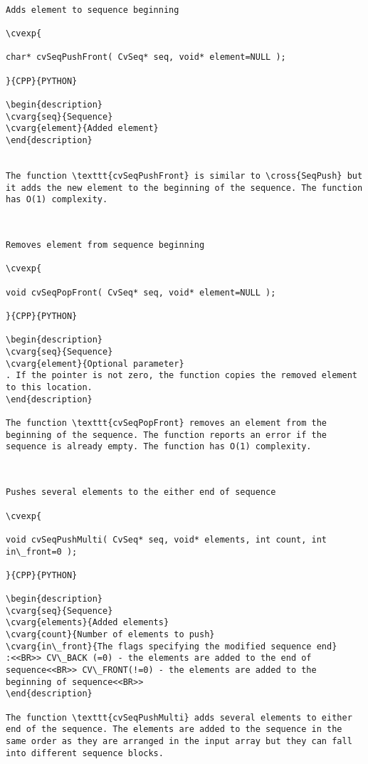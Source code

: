\label{SeqPushFront}
\begin{verbatim}

Adds element to sequence beginning

\cvexp{

char* cvSeqPushFront( CvSeq* seq, void* element=NULL );

}{CPP}{PYTHON}

\begin{description}
\cvarg{seq}{Sequence}
\cvarg{element}{Added element}
\end{description}


The function \texttt{cvSeqPushFront} is similar to \cross{SeqPush} but it adds the new element to the beginning of the sequence. The function has O(1) complexity.


\end{verbatim}
\label{SeqPopFront}
\begin{verbatim}

Removes element from sequence beginning

\cvexp{

void cvSeqPopFront( CvSeq* seq, void* element=NULL );

}{CPP}{PYTHON}

\begin{description}
\cvarg{seq}{Sequence}
\cvarg{element}{Optional parameter}
. If the pointer is not zero, the function copies the removed element to this location.
\end{description}

The function \texttt{cvSeqPopFront} removes an element from the beginning of the sequence. The function reports an error if the sequence is already empty. The function has O(1) complexity.


\end{verbatim}
\label{SeqPushMulti}
\begin{verbatim}

Pushes several elements to the either end of sequence

\cvexp{

void cvSeqPushMulti( CvSeq* seq, void* elements, int count, int in\_front=0 );

}{CPP}{PYTHON}

\begin{description}
\cvarg{seq}{Sequence}
\cvarg{elements}{Added elements}
\cvarg{count}{Number of elements to push}
\cvarg{in\_front}{The flags specifying the modified sequence end}
:<<BR>> CV\_BACK (=0) - the elements are added to the end of sequence<<BR>> CV\_FRONT(!=0) - the elements are added to the beginning of sequence<<BR>>
\end{description}

The function \texttt{cvSeqPushMulti} adds several elements to either end of the sequence. The elements are added to the sequence in the same order as they are arranged in the input array but they can fall into different sequence blocks.


\end{verbatim}
